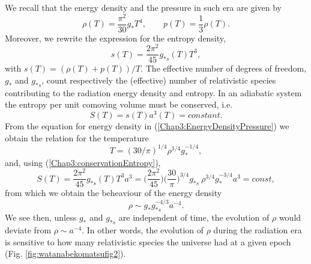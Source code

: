 \documentclass[11pt,a4paper,twoside]{book}
\begin{document}
We recall that the energy density and the pressure in such era are given by 
\begin{equation}
\label{Chap3:EnergyDensityPressure}
 \rho(T)= \frac{\pi^{2}}{30}g_{*}T^{4} ,  
 \qquad
 p(T)=\frac{1}{3}\rho(T).
\end{equation}	
Moreover, we rewrite the expression for the entropy density,
\begin{equation}
	\label{Chap3:entropy}
	s(T)=\frac{2\pi^{2}}{45}g_{*s}(T)T^{3},
\end{equation}
with $ s(T) =(\rho(T) + p(T))/T $. The effective number of degrees of freedom, $ g_{*} $ and $ g_{*s} $, count respectively the (effective) number of relativistic species contributing to the radiation energy density and entropy. In an adiabatic system the entropy per unit comoving volume must be conserved, i.e. 
\begin{equation}
	\label{Chap3:conservationEntropy}
	S(T) = s(T)a^{3}(T) = constant.
\end{equation}
From the equation for energy density in (\ref{Chap3:EnergyDensityPressure}) we obtain the relation for the temperature
\begin{equation}
\label{Chap3:DependenceTemperature}
T = (30/\pi)^{1/4} \rho^{1/4}g_{*}^{-1/4} ,
\end{equation}
and, using (\ref{Chap3:conservationEntropy}),
\begin{equation}
	S(T)=\frac{2\pi^{2}}{45}g_{*s}(T)T^{3}a^{3} = \Big (\frac{2\pi^{2}}{45}\Big)\Big(\frac{30}{\pi}\Big)^{3/4} g_{*s}\ \rho^{3/4}g_{*}^{-3/4}a^{3} = const,
\end{equation}
from which we obtain the beheaviour of the energy density
\begin{equation}
	\label{Chap3:DependenceEnergyDensity}
	\rho \sim g_{*}g_{*s}^{-4/3}a^{-4}.
\end{equation}
We see then, unless $ g_{*} $ and $ g_{*s} $ are independent of time, the evolution of $\rho$ would deviate from $\rho \sim a^{-4}$. In other words, the evolution of $\rho$ during the radiation era is sensitive to how many relativistic species the universe had at a given epoch (Fig. \ref{fig:watanabekomatsufig2}).
\end{document}
